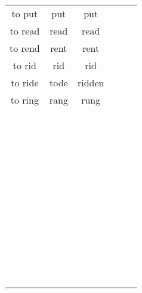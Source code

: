 \documentclass[a4paper, titlepage]{article}
\begin{document}
\begin{tabular}{ccc}
to put&put&put\\
to read&read&read\\
to rend&rent&rent\\
to rid&rid&rid\\
to ride&tode&ridden\\
to ring&rang&rung\\
&&\\
&&\\
&&\\
&&\\
&&\\
&&\\
&&\\
&&\\
&&\\
&&\\
&&\\
&&\\
&&\\
&&\\
&&\\
&&\\
&&\\
&&\\
&&\\
&&\\
&&\\
&&\\
&&\\
&&\\
&&\\
&&\\
&&\\
&&\\
&&\\
&&\\
&&\\
&&\\
&&\\
&&\\
&&\\
&&\\
&&\\
&&\\
&&&&&&\\
&&\\
&&\\
&&\\
&&\\
&&\\
&&\\
&&\\
&&\\
&&\\
&&&&\\
&&\\

\end{tabular}
\end{document}
